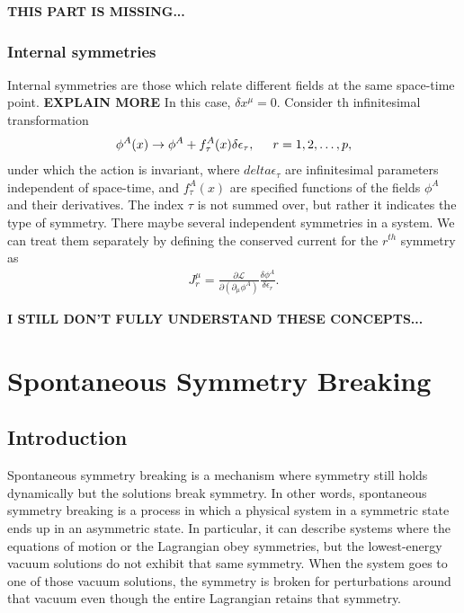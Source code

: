 \documentclass{book}
\numberwithin{equation}{section}
\theoremstyle{definition}
\newcommand{\p}{\partial}
\newcommand{\lag}{\mathcal{L}}
\begin{document}
\textbf{THIS PART IS MISSING...}







\subsection{Internal symmetries}

Internal symmetries are those which relate different fields at the same space-time point. \textbf{EXPLAIN MORE} In this case, $\delta x^\mu = 0$. Consider th infinitesimal transformation
\begin{align}
\phi^A(x) \to \phi^A + f^A_\tau(x)\delta \epsilon_\tau, \hspace{0.5cm}r=1,2,\dots,p,
\end{align}
under which the action is invariant, where $delta \epsilon_\tau$ are infinitesimal parameters independent of space-time, and $f^A_\tau(x)$ are specified functions of the fields $\phi^A$ and their derivatives. The index $\tau$ is not summed over, but rather it indicates the type of symmetry. There maybe several independent symmetries in a system. We can treat them separately by defining the conserved current for the $r^{th}$ symmetry as
\begin{align}
J^\mu_r = \frac{\p \lag}{\p (\p_\mu\phi^A)}\frac{\delta \phi^A}{\delta \epsilon_r}.
\end{align}

\textbf{I STILL DON'T FULLY UNDERSTAND THESE CONCEPTS...}






















\newpage


\chapter{Spontaneous Symmetry Breaking}
\section{Introduction}
Spontaneous symmetry breaking is a mechanism where symmetry still holds dynamically but the solutions break symmetry. In other words, spontaneous symmetry breaking is a process in which a physical system in a symmetric state ends up in an asymmetric state. In particular, it can describe systems where the equations of motion or the Lagrangian obey symmetries, but the lowest-energy vacuum solutions do not exhibit that same symmetry. When the system goes to one of those vacuum solutions, the symmetry is broken for perturbations around that vacuum even though the entire Lagrangian retains that symmetry.\\
\end{document}
